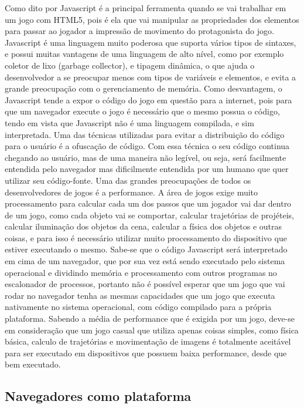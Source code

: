 Como dito por  Javascript é a principal ferramenta
quando se vai trabalhar em um jogo com HTML5, pois é ela que vai
manipular as propriedades dos elementos para passar ao jogador a
impressão de movimento do protagonista do jogo.
Javascript é uma linguagem muito poderosa que suporta vários tipos de
sintaxes, e possui muitas vantagens de uma linguagem de alto nível,
como por exemplo coletor de lixo (garbage collector), e tipagem
dinâmica, o que ajuda o desenvolvedor a se preocupar menos com tipos
de variáveis e elementos, e evita a grande preocupação com o
gerenciamento de memória.
Como desvantagem, o Javascript tende a expor o código do jogo em
questão para a internet, pois para que um navegador execute o jogo é
necessário que o mesmo possua o código, tendo em vista que Javascript
não é uma linguagem compilada, e sim interpretada. Uma das técnicas
utilizadas para evitar a distribuição do código para o usuário é a
ofuscação de código. Com essa técnica o seu código continua chegando
ao usuário, mas de uma maneira não legível, ou seja, será facilmente
entendida pelo navegador mas dificilmente entendida por um humano que
quer utilizar seu código-fonte.
Uma das grandes preocupações de todos os desenvolvedores de jogos é a
performance. A área de jogos exige muito processamento para calcular
cada um dos passos que um jogador vai dar dentro de um jogo, como cada
objeto vai se comportar, calcular trajetórias de projéteis, calcular
iluminação dos objetos da cena, calcular a física dos objetos e outras
coisas, e para isso é necessário utilizar muito processamento do
dispositivo que estiver executando o mesmo.
Sabe-se que o código Javascript será interpretado em cima de um navegador, que por sua vez está sendo
executado pelo sistema operacional e dividindo memória e processamento
com outros programas no escalonador de processos, portanto não
é possível esperar que um jogo que vai rodar no navegador tenha as mesmas
capacidades que um jogo que executa nativamente no sistema
operacional, com código compilado para a própria plataforma.
Sabendo a média de performance que é exigida por um jogo,
deve-se em consideração que um jogo casual que utiliza apenas
coisas simples, como física básica, calculo de trajetórias e
movimentação de imagens é totalmente aceitável para ser executado em
dispositivos que possuem baixa performance, desde que bem executado.

\subsection{Navegadores como plataforma}

